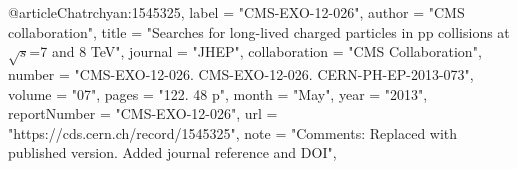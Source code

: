 @article{Chatrchyan:1545325,
      label          = "CMS-EXO-12-026",
      author        = "{CMS collaboration}",
      title         = "{Searches for long-lived charged particles in pp
                       collisions at $\sqrt{s}$=7 and 8 TeV}",
      journal       = "JHEP",
      collaboration = "CMS Collaboration",
      number        = "CMS-EXO-12-026. CMS-EXO-12-026. CERN-PH-EP-2013-073",
      volume        = "07",
      pages         = "122. 48 p",
      month         = "May",
      year          = "2013",
      reportNumber  = "CMS-EXO-12-026",
      url           = "https://cds.cern.ch/record/1545325",
      note          = "Comments: Replaced with published version. Added journal
                       reference and DOI",
}

